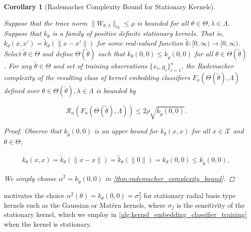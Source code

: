 \documentclass{article}
\newtheorem{corollary}[theorem]{Corollary}
\begin{document}
		\begin{corollary}[Rademacher Complexity Bound for Stationary Kernels]
		\label{thm:rademacher_complexity_stationary_kernels_bound}
	
			Suppose that the trace norm $\| W_{\theta, \lambda} \|_{\mathrm{tr}} \leq \rho$ is bounded for all $\theta \in \Theta, \lambda \in \Lambda$. Suppose that $k_{\theta}$ is a family of positive definite stationary kernels. That is, $k_{\theta} (x, x') = \tilde{k}_{\theta}( \| x - x' \| )$ for some real-valued function $\tilde{k} : [0, \infty) \to [0, \infty)$. Select $\tilde{\theta} \in \Theta$ and define $\Theta(\tilde{\theta})$ such that $k_{\theta}(0, 0) \leq k_{\tilde{\theta}}(0, 0)$ for all $\theta \in \Theta(\tilde{\theta})$. For any $\tilde{\theta} \in \Theta$ and set of training observations $\{x_{i}, y_{i}\}_{i = 1}^{n}$, the Rademacher complexity of the resulting class of kernel embedding classifiers $F_{n}(\Theta(\tilde{\theta}), \Lambda)$ defined over $\theta \in \Theta(\tilde{\theta}), \lambda \in \Lambda$ is bounded by
		
			\begin{equation}
				\mathcal{R}_{n}(F_{n}(\Theta(\tilde{\theta}), \Lambda)) \leq 2 \rho \sqrt{k_{\tilde{\theta}}(0, 0)}.
			\end{equation}
			
			\begin{proof}
				
				Observe that $k_{\tilde{\theta}}(0, 0)$ is an upper bound for $k_{\theta}(x, x)$ for all $x \in \mathcal{X}$ and $\theta \in \Theta$,
				
				\begin{equation}
					\begin{aligned}
						k_{\theta}(x, x) = \tilde{k}_{\theta}( \| x - x \| ) = \tilde{k}_{\theta}( \| 0 \| ) = k_{\theta}(0, 0) \leq k_{\tilde{\theta}}(0, 0),
					\end{aligned}
				\end{equation}
				
				We simply choose $\alpha^{2} = k_{\tilde{\theta}}(0, 0)$ in \cref{thm:rademacher_complexity_bound}.
			\end{proof}
		
		\end{corollary}
	
		 motivates the choice $\alpha^{2}(\theta) = k_{\theta}(0, 0) = \sigma_{f}^{2}$ for stationary radial basis type kernels such as the Gaussian or Mat\'{e}rn kernels, where $\sigma_{f}$ is the sensitivity \citep{rasmussen2006gaussian} of the stationary kernel, which we employ in \cref{alg:kernel_embedding_classifier_training} when the kernel is stationary.
\end{document}
